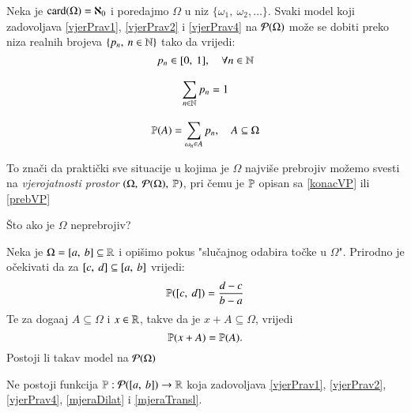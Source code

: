 \begin{pr} \label{primjer14}
    Neka je $\textnormal{card}({\Omega}) = \aleph_0$ i poredajmo $\Omega$ u niz
    $\{ \omega_1, \: \omega_2, \dots \}$. Svaki model koji
    zadovoljava \eqref{vjerPrav1}, \eqref{vjerPrav2} i
    \eqref{vjerPrav4} na $\mathcal{P}({\Omega})$ mo\v ze se dobiti
    preko niza realnih brojeva $\{p_n, \: n \in \mathbb{N} \}$ tako da
    vrijedi:
    \begin{equation}   %
        p_n \in [0, \: 1], \quad \forall n \in \N
    \end{equation}

    \begin{equation}
        \sum\limits_{n \in \mathbb{N}}^{} p_n = 1
    \end{equation}

    \begin{equation} \label{prebVP}
        \mathbb{P}({A}) = \sum\limits_{\omega_n \in A}^{} p_n, \quad A
            \subseteq \Omega
    \end{equation}
\end{pr}

To zna\v ci da prakti\v cki sve situacije u kojima je $\Omega$ najvi\v se
prebrojiv mo\v zemo svesti na \emph{vjerojatnosti prostor} $(\Omega,
\: \mathcal{P}({\Omega}), \: \mathbb{P})$, pri \v cemu je $\mathbb{P}$ opisan
sa \eqref{konacVP} ili \eqref{prebVP}

\v Sto ako je $\Omega$ neprebrojiv?

\begin{pr}
    Neka je $\Omega = [{a}, \:{b}] \subseteq \mathbb{R}$ i opi\v simo pokus
    "slu\v cajnog odabira to\v cke u $\Omega$". Prirodno je
    o\v cekivati da za $[{c}, \:{d}] \subseteq [{a}, \:{b}]$ vrijedi:
    \begin{equation} \label{mjeraDilat}
        \mathbb{P}({[{c}, \:{d}]}) = \frac{d - c}{b - a}
    \end{equation}
    Te za doga\dj aj $A \subseteq \Omega$ i $x \in \mathbb{R}$, takve da je
    $x + A \subseteq \Omega$, vrijedi
    \begin{equation} \label{mjeraTransl}
        \mathbb{P}({x + A}) = \mathbb{P}({A}).
    \end{equation}
    Postoji li takav model na $\mathcal{P}({\Omega})$
\end{pr}

\begin{tm}
    Ne postoji funkcija $\mathbb{P}: \mathcal{P}({[{a}, \:{b}]}) \to \mathbb{R}$
    koja zadovoljava \eqref{vjerPrav1}, \eqref{vjerPrav2},
    \eqref{vjerPrav4}, \eqref{mjeraDilat} i \eqref{mjeraTransl}.
\end{tm}

